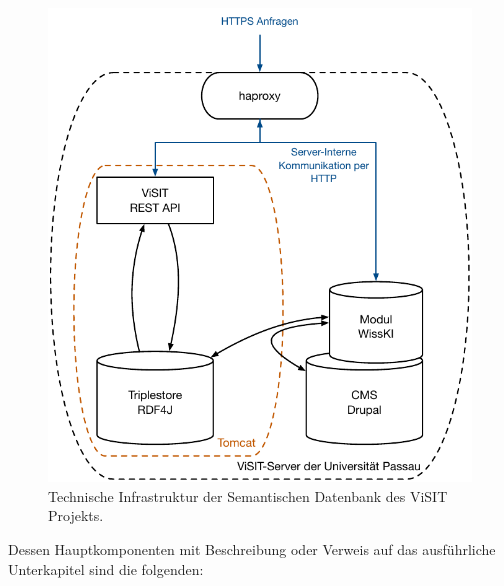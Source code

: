 \begin{figure}[htb]
    \centering
    \includegraphics[width=\textwidth]{Figures/berndl/infrastructure}
    \caption{\label{fig:infrastructure} Technische Infrastruktur der Semantischen Datenbank des ViSIT Projekts.}
\end{figure}

Dessen Hauptkomponenten mit Beschreibung oder Verweis auf das ausführliche Unterkapitel sind die folgenden:

